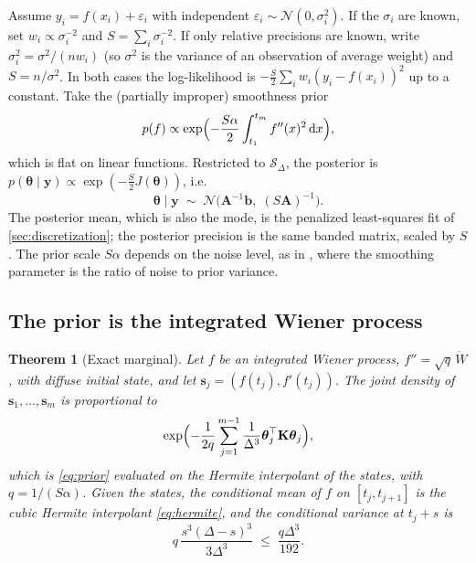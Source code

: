 \documentclass[11pt,a4paper]{article}
\newtheorem{theorem}{Theorem}
\theoremstyle{definition}
\theoremstyle{remark}
\newcommand{\N}{\mathcal{N}}
\newcommand{\vth}{\boldsymbol{\theta}}
\newcommand{\vb}{\mathbf{b}}
\newcommand{\mA}{\mathbf{A}}
\newcommand{\mK}{\mathbf{K}}
\newcommand{\Sd}{\mathcal{S}_\Delta}
\newcommand{\dd}{\,\mathrm{d}}
\begin{document}
Assume $y_i=f(x_i)+\varepsilon_i$ with independent $\varepsilon_i\sim\N(0,\sigma_i^2)$. If the $\sigma_i$ are known, set $w_i\propto\sigma_i^{-2}$ and $S=\sum_i\sigma_i^{-2}$. If only relative precisions are known, write $\sigma_i^2=\sigma^2/(nw_i)$ (so $\sigma^2$ is the variance of an observation of average weight) and $S=n/\sigma^2$. In both cases the log-likelihood is $-\tfrac S2\sum_iw_i(y_i-f(x_i))^2$ up to a constant. Take the (partially improper) smoothness prior
\begin{equation}
\label{eq:prior}
p(f)\propto\exp\Bigl(-\frac{S\alpha}{2}\int_{t_1}^{t_m}f''(x)^2\dd x\Bigr),
\end{equation}
which is flat on linear functions. Restricted to $\Sd$, the posterior is $p(\vth\mid\mathbf y)\propto\exp(-\tfrac S2J(\vth))$, i.e.
\begin{equation}
\label{eq:posterior}
\vth\mid\mathbf y\;\sim\;\N\bigl(\mA^{-1}\vb,\;(S\mA)^{-1}\bigr).
\end{equation}
The posterior mean, which is also the mode, is the penalized least-squares fit of \cref{sec:discretization}; the posterior precision is the same banded matrix, scaled by $S$. The prior scale $S\alpha$ depends on the noise level, as in \citet{Wahba1978}, where the smoothing parameter is the ratio of noise to prior variance.

\subsection{The prior is the integrated Wiener process}

\begin{theorem}[Exact marginal]
\label{thm:iwp}
Let $f$ be an integrated Wiener process, $f''=\sqrt{q}\,\dot W$, with diffuse initial state, and let $\mathbf s_j=(f(t_j),f'(t_j))$. The joint density of $\mathbf s_1,\dots,\mathbf s_m$ is proportional to
\[
\exp\Bigl(-\frac{1}{2q}\sum_{j=1}^{m-1}\frac{1}{\Delta^3}\vth_j^\top\mK\vth_j\Bigr),
\]
which is \eqref{eq:prior} evaluated on the Hermite interpolant of the states, with $q=1/(S\alpha)$. Given the states, the conditional mean of $f$ on $[t_j,t_{j+1}]$ is the cubic Hermite interpolant \eqref{eq:hermite}, and the conditional variance at $t_j+s$ is
\begin{equation}
\label{eq:bridge}
q\,\frac{s^3(\Delta-s)^3}{3\Delta^3}\;\le\;\frac{q\Delta^3}{192}.
\end{equation}
\end{theorem}
\end{document}
